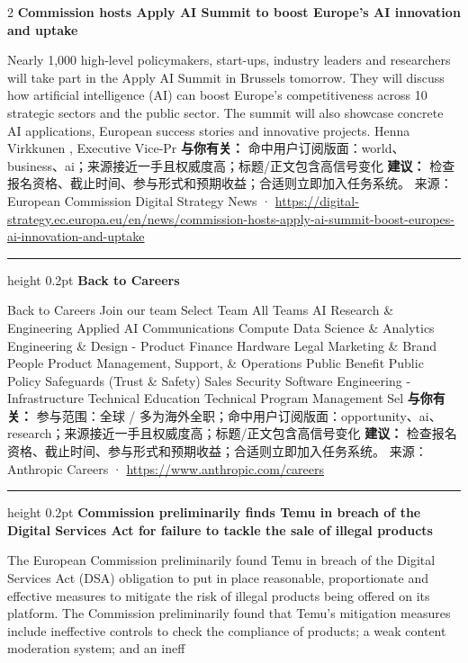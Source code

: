 \documentclass[10.5pt]{ctexart}
\begin{document}
\begin{multicols}{2}
{\large\bfseries Commission hosts Apply AI Summit to boost Europe’s AI innovation and uptake}\par
Nearly 1,000 high-level policymakers, start-ups, industry leaders and researchers will take part in the Apply AI Summit in Brussels tomorrow. They will discuss how artificial intelligence (AI) can boost Europe’s competitiveness across 10 strategic sectors and the public sector. The summit will also showcase concrete AI applications, European success stories and innovative projects. Henna Virkkunen , Executive Vice-Pr
\textbf{与你有关：} 命中用户订阅版面：world、business、ai；来源接近一手且权威度高；标题/正文包含高信号变化
\textbf{建议：} 检查报名资格、截止时间、参与形式和预期收益；合适则立即加入任务系统。
{\footnotesize\color{ormuted} 来源：European Commission Digital Strategy News · \url{https://digital-strategy.ec.europa.eu/en/news/commission-hosts-apply-ai-summit-boost-europes-ai-innovation-and-uptake}}
\vspace{2mm}
\hrule height 0.2pt
\vspace{2mm}
{\large\bfseries Back to Careers}\par
Back to Careers Join our team Select Team All Teams AI Research \& Engineering Applied AI Communications Compute Data Science \& Analytics Engineering \& Design - Product Finance Hardware Legal Marketing \& Brand People Product Management, Support, \& Operations Public Benefit Public Policy Safeguards (Trust \& Safety) Sales Security Software Engineering - Infrastructure Technical Education Technical Program Management Sel
\textbf{与你有关：} 参与范围：全球 / 多为海外全职；命中用户订阅版面：opportunity、ai、research；来源接近一手且权威度高；标题/正文包含高信号变化
\textbf{建议：} 检查报名资格、截止时间、参与形式和预期收益；合适则立即加入任务系统。
{\footnotesize\color{ormuted} 来源：Anthropic Careers · \url{https://www.anthropic.com/careers}}
\vspace{2mm}
\hrule height 0.2pt
\vspace{2mm}
{\large\bfseries Commission preliminarily finds Temu in breach of the Digital Services Act for failure to tackle the sale of illegal products}\par
The European Commission preliminarily found Temu in breach of the Digital Services Act (DSA) obligation to put in place reasonable, proportionate and effective measures to mitigate the risk of illegal products being offered on its platform. The Commission preliminarily found that Temu's mitigation measures include ineffective controls to check the compliance of products; a weak content moderation system; and an ineff

\end{multicols}
\end{document}
